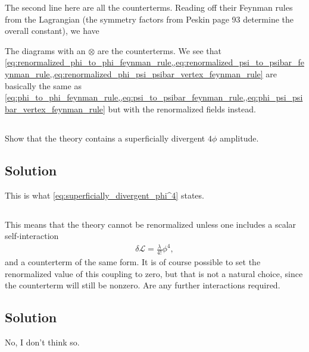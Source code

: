 The second line here are all the counterterms. Reading off their Feynman rules from the Lagrangian (the symmetry factors from Peskin page 93 determine the overall constant), we have 

The diagrams with an $\otimes$ are the counterterms. We see that \cref{eq:renormalized_phi_to_phi_feynman_rule,,eq:renormalized_psi_to_psibar_feynman_rule,,eq:renormalized_phi_psi_psibar_vertex_feynman_rule} are basically the same as \cref{eq:phi_to_phi_feynman_rule,,eq:psi_to_psibar_feynman_rule,,eq:phi_psi_psibar_vertex_feynman_rule} but with the renormalized fields instead.







\subsection{}
Show that the theory contains a superficially divergent $4 \phi$ amplitude.

\subsection*{Solution}

This is what \cref{eq:superficially_divergent_phi^4} states.




\subsection{}
This means that the theory cannot be renormalized unless one includes a scalar self-interaction
\begin{align}
    \delta \mathcal{L} = \frac{\lambda}{4!} \phi^4,
\end{align}
and a counterterm of the same form. It is of course possible to set the renormalized value of this coupling to zero, but that is not a natural choice, since the counterterm will still be nonzero. Are any further interactions required.

\subsection*{Solution}

No, I don't think so.


\section{}

